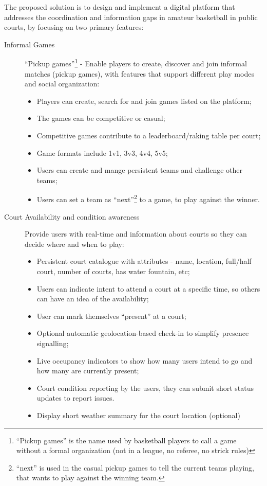 The proposed solution is to design and implement a digital platform that addresses the coordination and information gaps in amateur basketball in public courts, by focusing on two primary features:

\begin{description}
    \item [Informal Games] ``Pickup games''\footnote{``Pickup games'' is the name used by basketball players to call a game without a formal organization (not in a league, no referee, no strick rules)} -
    Enable players to create, discover and join informal matches (pickup games), with features that support different play modes and social organization:
    \begin{itemize}
        \item Players can create, search for and join games listed on the platform;
        \item The games can be competitive or casual;
        \item Competitive games contribute to a leaderboard/raking table per court;
        \item Game formats include 1v1, 3v3, 4v4, 5v5;
        \item Users can create and mange persistent teams and challenge other teams;
        \item Users can set a team as ``next''\footnote{``next'' is used in the casual pickup games to tell the current teams playing, that wants to play against the winning team.} to a game, to play against the winner.
    \end{itemize}

    \item[Court Availability and condition awareness]
    Provide users with real-time and information about courts so they can decide where and when to play:
    \begin{itemize}
        \item Persistent court catalogue with attributes - name, location, full/half court, number of courts, has water fountain, etc;
        \item Users can indicate intent to attend a court at a specific time, so others can have an idea of the availability;
        \item User can mark themselves ``present'' at a court;
        \item Optional automatic geolocation-based check-in to simplify presence signalling;
        \item Live occupancy indicators to show how many users intend to go and how many are currently present;
        \item Court condition reporting by the users, they can submit short status updates to report issues.
        \item Display short weather summary for the court location (optional)
    \end{itemize}
\end{description}


